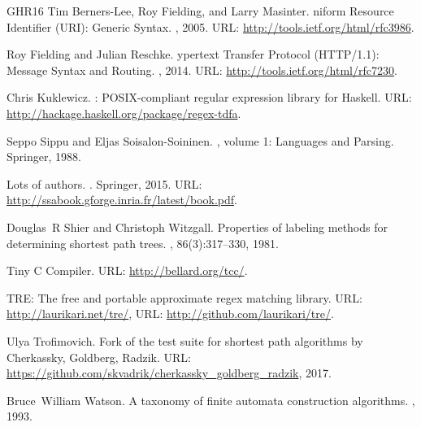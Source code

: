 \documentclass{article}
\theoremstyle{definition}
\begin{document}
\begin{thebibliography}{GHR{\etalchar{+}}16}
Tim Berners-Lee, Roy Fielding, and Larry Masinter.
niform {R}esource {I}dentifier ({URI}): {G}eneric {S}yntax.
, 2005.
\newblock URL: \url{http://tools.ietf.org/html/rfc3986}.

Roy Fielding and Julian Reschke.
ypertext {T}ransfer {P}rotocol ({HTTP/1.1}): {M}essage {S}yntax
  and {R}outing.
, 2014.
\newblock URL: \url{http://tools.ietf.org/html/rfc7230}.

Chris Kuklewicz.
: {POSIX}-compliant regular expression library for
  {Haskell}.
\newblock URL: \url{http://hackage.haskell.org/package/regex-tdfa}.

Seppo Sippu and Eljas Soisalon-Soininen.
, volume 1: Languages and Parsing.
\newblock Springer, 1988.

{Lots of authors}.
.
\newblock Springer, 2015.
\newblock URL: \url{http://ssabook.gforge.inria.fr/latest/book.pdf}.

Douglas~R Shier and Christoph Witzgall.
\newblock Properties of labeling methods for determining shortest path trees.
,
  86(3):317--330, 1981.

{T}iny {C} {C}ompiler.
\newblock URL: \url{http://bellard.org/tcc/}.

{TRE}: The free and portable approximate regex matching library.
\newblock URL: \url{http://laurikari.net/tre/}, URL:
  \url{http://github.com/laurikari/tre/}.

Ulya Trofimovich.
\newblock Fork of the test suite for shortest path algorithms by {Cherkassky},
  {Goldberg}, {Radzik}.
\newblock URL: \url{https://github.com/skvadrik/cherkassky_goldberg_radzik},
  2017.

Bruce~William Watson.
\newblock A taxonomy of finite automata construction algorithms.
, 1993.

\end{thebibliography}
\end{document}
